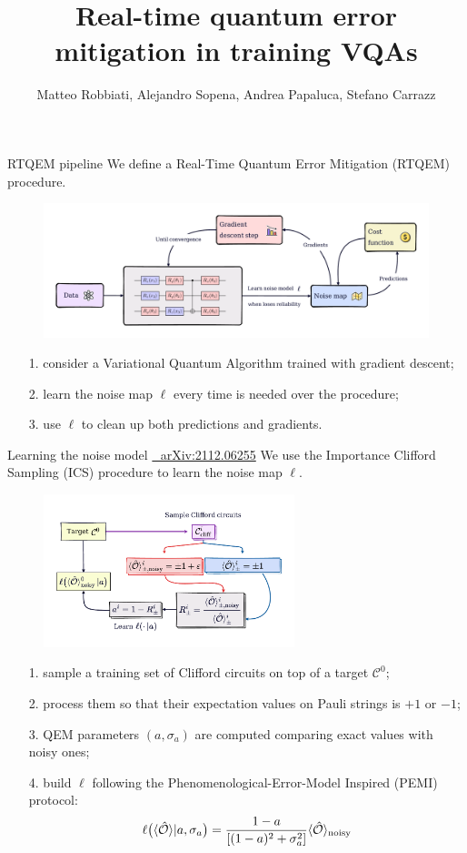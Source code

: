 \documentclass[8pt, xcolor={svgnames}, hyperref={linkcolor=black}]{beamer}
\title{Real-time quantum error mitigation in training VQAs}
\date{}
\author[Matteo Robbiati, Alejandro Sopena, Andrea Papaluca, Stefano Carrazza]{Matteo Robbiati, Alejandro Sopena, Andrea Papaluca, Stefano Carrazz}
\begin{document}
\begin{frame}{RTQEM pipeline}
We define a Real-Time Quantum Error Mitigation (RTQEM) procedure.
\begin{figure}
    \includegraphics[width=1\textwidth]{figures/rtqem.pdf}
\end{figure}
\begin{itemize}[noitemsep]
\item[1.] consider a Variational Quantum Algorithm trained with gradient descent;
\item[2.] learn the noise map $\ell$ every time is needed over the procedure;
\item[3.] use $\ell$ to clean up both predictions and gradients.
\end{itemize}
\end{frame}

\begin{frame}{Learning the noise model \hfill \href{https://arxiv.org/abs/2112.06255}{\faBook\,\, arXiv:2112.06255}}
We use the Importance Clifford Sampling (ICS) procedure to learn the noise map $\ell$.
\begin{figure}
    \includegraphics[width=0.65\textwidth]{figures/ics.pdf}
\end{figure}
\begin{itemize}[noitemsep]
\item[1.] sample a training set of Clifford circuits on top of a target $\mathcal{C}^0$;
\item[2.] process them so that their expectation values on Pauli strings is  $+1$ or $-1$;
\item[3.] QEM parameters $(a,  \sigma_a)$ are computed comparing exact values with noisy ones;
\item[4.] build $\ell$ following the Phenomenological-Error-Model Inspired (PEMI) protocol:
$$ \ell\bigl( \langle \hat{\mathcal{O}} \rangle | a, \sigma_a \bigr) = \frac{1-a}{[(1-a)^2 + 
\sigma_a^2]} \langle \hat{\mathcal{O}} \rangle_{\rm noisy} $$
\end{itemize}
\end{frame}
\end{document}

